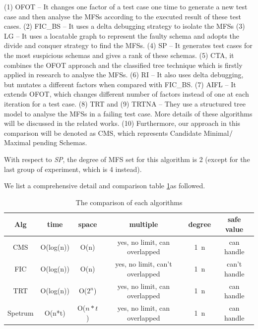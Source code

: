 \documentclass{sig-alternate-05-2015}
\begin{document}
{{(1) OFOT \cite{nie2011minimal} -- It changes one factor of a test case one time to generate a new test case and then analyse the MFSs according to the executed result of these test cases. (2) FIC\_BS \cite{zhang2011characterizing} -- It uses a delta debugging strategy to isolate the MFSs (3) LG \cite{martinez2008algorithms,martinez2009locating} -- It uses a locatable graph to represent the faulty schema and adopts the divide and conquer strategy to find the MFSs. (4) SP\cite{ghandehari2012identifying} -- It generates test cases for the most suspicious schemas and gives a rank of these schemas. (5) CTA\cite{shakya2012isolating}, it combines the OFOT approach and the classified tree technique which is firstly applied in research \cite{yilmaz2006covering}  to analyse the MFSs. (6) RI \cite{li2012improved} -- It also uses delta debugging, but mutates a different factors  when compared with FIC\_BS. (7) AIFL \cite{wang2010adaptive} -- It extends OFOT, which changes different number of factors instead of one at each iteration for a test case. (8) TRT \cite{niu2013identifying} and (9) TRTNA \cite{niu2013identifying} --  They use a structured tree model to analyse the MFSs in a failing test case.  More details of these algorithms will be discussed in the related works. (10) Furthermore, our approach in this comparison will be denoted as CMS, which represents Candidate Minimal$\//$Maximal pending Schemas.

With respect to \emph{SP}, the degree of MFS set for this algorithm is 2 (except for the last group of experiment, which is 4 instead).

We list a comprehensive detail and comparison table \ref{comparison-metrics}as followed.

\begin{table}\renewcommand{\arraystretch}{1.3}
  \caption{The comparison of each algorithms} \centering
  \label{comparison-metrics}
  \begin{tabular}{c|c|c|c|c|c}\hline
  \hline
  \bfseries Alg & \bfseries time  & \bfseries space & \bfseries multiple  & \bfseries degree & \bfseries safe value \\
  \hline
    CMS & O(log(n)) & O(n) & yes, no limit, can overlapped & 1~n & can handle \\
  \hline
    FIC & O(log(n)) & O(n) & yes, no limit, can't overlapped & 1~n & can't handle \\
    TRT & O(log(n)) & O($2^n$) & yes, no limit, can overlapped & 1~n & can handle  \\
    Spetrum & O(n*t) & O($n*t$) & yes, no limit, can overlapped & 1~n & can handle  \\
  \hline
  \end{tabular}


\end{table}}}
\end{document}
